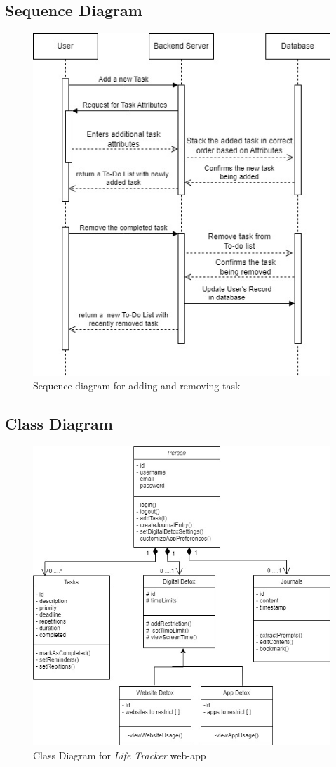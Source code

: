 \subsection{Sequence Diagram}
\begin{figure}[hbt!]
    \centering
     \includegraphics[width=150mm]{sequence.jpg}
    \caption{Sequence diagram for adding and removing task}
    \label{fig:Sequence Diagram}
\end{figure}
\newpage
\subsection{Class Diagram}
\begin{figure}[hbt!]
    \centering
     \includegraphics[width=150mm]{class.jpg}
    \caption{Class Diagram for \textit{Life Tracker} web-app }
    \label{fig:Class Diagram}
\end{figure}
